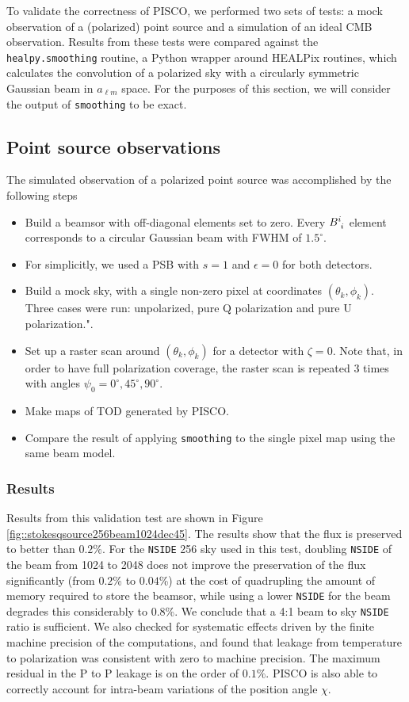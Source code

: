 \documentclass[a4paper,11pt]{article}
\begin{document}
To validate the correctness of PISCO, we performed two sets of tests: a mock observation of a (polarized) point source and a simulation of an ideal CMB observation. Results from these tests were compared against the \texttt{healpy.smoothing} routine, a Python wrapper around HEALPix routines, which calculates the convolution of a polarized sky with a circularly symmetric Gaussian beam in $a_{\ell m}$ space. For the purposes of this section, we will consider the output of \texttt{smoothing} to be exact. 

\subsection{Point source observations}

The simulated observation of a polarized point source was accomplished by the following steps

\begin{itemize}
    \item Build a beamsor with off-diagonal elements set to zero. Every $\tensor{B}{^i_i}$ element corresponds to a circular Gaussian beam with FWHM of $1.5^\circ$. 
    \item For simplicitly, we used a PSB with $s=1$ and $\epsilon=0$ for both detectors.
	\item Build a mock sky, with a single non-zero pixel at coordinates $(\theta_k,\phi_k)$. Three cases were run: unpolarized, pure Q polarization and pure U polarization.".
	\item Set up a raster scan around $(\theta_k,\phi_k)$ for a detector with $\zeta=0$. Note that, in order to have full polarization coverage, the raster scan is repeated 3 times with angles $\psi_0 = 0^{\circ},45^{\circ},90^{\circ}$.
	\item Make maps of TOD generated by PISCO.
	\item Compare the result of applying \texttt{smoothing} to the single pixel map using the same beam model.
\end{itemize}

\subsubsection{Results}

Results from this validation test are shown in Figure \ref{fig::stokesqsource256beam1024dec45}. The results show that the flux is preserved to better than $0.2\%$. For the \texttt{NSIDE} 256 sky used in this test, doubling \texttt{NSIDE} of the beam from 1024 to 2048 does not improve the preservation of the flux significantly (from $0.2$\% to $0.04$\%) at the cost of quadrupling the amount of memory required to store the beamsor, while using a lower \texttt{NSIDE} for the beam degrades this considerably to $0.8$\%. We conclude that a 4:1 beam to sky \texttt{NSIDE} ratio is sufficient. We also checked for systematic effects driven by the finite machine precision of the computations, and found that leakage from temperature to polarization was consistent with zero to machine precision. The maximum residual in the P to P leakage is on the order of $0.1\%$. PISCO is also able to correctly account for intra-beam variations of the position angle $\chi$.
\end{document}
